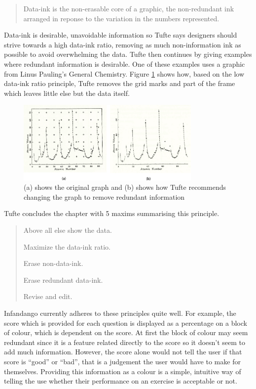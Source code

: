 \begin{quote}Data-ink is the non-erasable core of a graphic, the non-redundant ink arranged in reponse to the variation in the numbers represented.
\end{quote}
Data-ink is desirable, unavoidable information so Tufte says designers should strive towards a high data-ink ratio, removing as much non-information ink as possible to avoid overwhelming the data. Tufte then continues by giving examples where redundant information is desirable. One of these examples uses a graphic from Linus Pauling's General Chemistry\cite{general_chemistry}. Figure \ref{fig:tuftegraphs} shows how, based on the low data-ink ratio principle, Tufte removes the grid marks and part of the frame which leaves little else but the data itself.

\begin{figure}[h!]
\centering
\includegraphics[width=0.8\textwidth]{images/tuftegraphs.png}
\caption{(a) shows the original graph and (b) shows how Tufte recommends changing the graph to remove redundant information}
\label{fig:tuftegraphs}
\end{figure}


Tufte concludes the chapter with 5 maxims summarising this principle.

\begin{verse}
	Above all else show the data.
	
	Maximize the data-ink ratio.
	
	Erase non-data-ink.
	
	Erase redundant data-ink.
	
	Revise and edit.
	
\end{verse}

Infandango currently adheres to these principles quite well. For example, the score which is provided for each question is displayed as a percentage on a block of colour, which is dependent on the score. At first the block of colour may seem redundant since it is a feature related directly to the score so it doesn't seem to add much information. However, the score alone would not tell the user if that score is ``good'' or ``bad'', that is a judgement the user would have to make for themselves. Providing this information as a colour is a simple, intuitive way of telling the use whether their performance on an exercise is acceptable or not.

